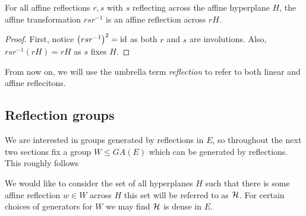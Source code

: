 \documentclass[../main.tex]{subfiles}
\begin{document}
\begin{proposition}
    For all affine reflections $r,s$ with $s$ reflecting across the affine hyperplane $H$, the affine transformation $rsr^{-1}$ is an affine reflection across $rH$.
    \begin{proof}
        First, notice $\left( rsr^{-1} \right)^2 = \text{id}$ as both $r$ and $s$ are involutions. Also, $rsr^{-1}(rH) = rH$ as $s$ fixes $H$.
    \end{proof}
\end{proposition}

From now on, we will use the umbrella term \textit{reflection} to refer to both linear and affine reflecitons.

\subsection{Reflection groups}
We are interested in groups generated by reflections in $E$, so throughout the next two sections fix a group $W\leq GA(E)$ which can be generated by reflections. This roughly follows \cite{Humphreys1990}

We would like to consider the set of all hyperplanes $H$ such that there is some affine reflection $w\in W$ across $H$ this set will be referred to as $\mathcal{H}$. For certain choices of generators for $W$ we may find $\mathcal{H}$ is dense in $E$.
\end{document}
